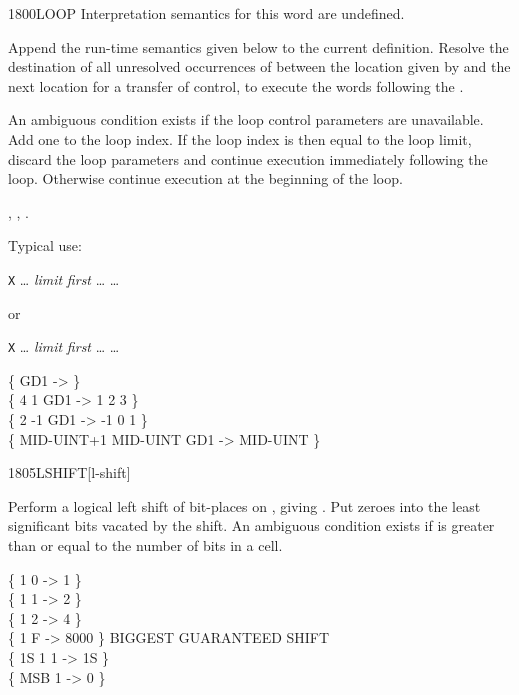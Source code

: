 \begin{worddef}{1800}{LOOP}
\interpret
	Interpretation semantics for this word are undefined.

\compile

	Append the run-time semantics given below to the current
	definition. Resolve the destination of all unresolved
	occurrences of  between the location given by
	 and the next location for a transfer of
	control, to execute the words following the .

\runtime
	\stack{}{}

	An ambiguous condition exists if the loop control parameters are
	unavailable. Add one to the loop index. If the loop index is then
	equal to the loop limit, discard the loop parameters and continue
	execution immediately following the loop. Otherwise continue
	execution at the beginning of the loop.

\see {},
	,
	.

	\begin{defer}
	\rationale %
		Typical use:

		\tab \word{:} \texttt{X} {\ldots}
			\emph{limit} \emph{first} 
				{\ldots}
		{\ldots} \word{;}

		or

		\tab \word{:} \texttt{X} {\ldots}
			\emph{limit} \emph{first} 
				{\ldots}
		{\ldots} \word{;}

	\testing
		\{ \word{:} GD1    \word{;} -> \} \\
		\{          4        1 GD1 ->  1 2 3 \} \\
		\{          2       -1 GD1 -> -1 0 1 \} \\
		\{ MID-UINT+1 MID-UINT GD1 -> MID-UINT \}
	\end{defer}
\end{worddef}


\begin{worddef}{1805}{LSHIFT}[l-shift]
\item {}

	Perform a logical left shift of  bit-places on
	, giving . Put zeroes into the least
	significant bits vacated by the shift. An ambiguous condition
	exists if  is greater than or equal to the number of
	bits in a cell.

	\begin{defer}
	\testing
		\{   1 0  -> 1 \} \\
		\{   1 1  -> 2 \} \\
		\{   1 2  -> 4 \} \\
		\{   1 F  -> 8000 \} \tab[4]  BIGGEST GUARANTEED SHIFT \\
		\{  1S 1  1  -> 1S \} \\
		\{ MSB 1  -> 0 \}
	\end{defer}
\end{worddef}


